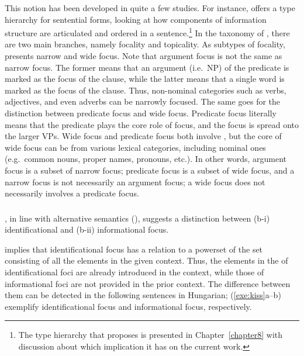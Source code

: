 This notion has been developed in quite a few studies. For instance,
\citet{paggio:09} offers a type hierarchy for sentential forms,
looking at how components of information structure are articulated and
ordered in a sentence.\footnote{The type hierarchy that
  \citeauthor{paggio:09} proposes is presented in
  Chapter~\ref{chapter8} with discussion about which implication it
  has on the current work.} In the taxonomy of \citet{paggio:09},
there are two main branches, namely focality and topicality.  As
subtypes of focality, \citeauthor{paggio:09} presents narrow  and
wide focus.
Note that argument focus is not the same as narrow
focus. The former means that an argument (i.e.\ NP) of the predicate
is marked as the focus of the clause, while the latter means that a
single word is marked as the focus of the clause. Thus, non-nominal
categories such as verbs, adjectives, and even adverbs can be narrowly
focused. The same goes for the distinction between predicate focus and
wide focus. Predicate focus literally means that the predicate plays
the core role of focus, and the focus is spread onto the larger VPs.
Wide focus and predicate focus both involve ,
but the core of wide focus can be from various lexical categories,
including nominal ones (e.g.\ common nouns, proper names, pronouns,
etc.). In other words, argument focus is a subset of narrow focus;
predicate focus is a subset of wide focus, and a narrow focus is not
necessarily an argument focus; a wide focus does not necessarily
involves a predicate focus.


\subsubsection{\citet{kiss:98}}
\label{3:sssec:kiss}

\citeauthor{kiss:98}, in line with alternative semantics
(\citealt{rooth:92}), suggests a distinction between (b-i)
identificational  and (b-ii) informational focus.


\noindent {} implies that identificational focus has a
relation to a powerset of the set consisting of all the elements in
the given context. Thus, the elements in the  of
identificational foci are already introduced in the context, while
those of informational foci are not provided in the prior context.
The difference between them can be detected in the following sentences
in Hungarian; (\ref{exe:kiss}a--b) exemplify identificational focus and
informational focus, respectively.


